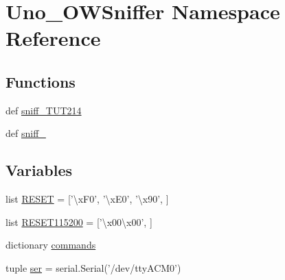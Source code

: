 \hypertarget{namespaceUno__OWSniffer}{\section{Uno\-\_\-\-O\-W\-Sniffer Namespace Reference}
\label{namespaceUno__OWSniffer}
}
\subsection*{Functions}
\begin{DoxyCompactItemize}
\item 
def \hyperlink{namespaceUno__OWSniffer_ab9b7dbfd72b7d37ee84523977c52fc53}{sniff\-\_\-\-T\-U\-T214}
\item 
def \hyperlink{namespaceUno__OWSniffer_adafc8a4e9025e3c731c0d0c50e475350}{sniff\-\_}
\end{DoxyCompactItemize}
\subsection*{Variables}
\begin{DoxyCompactItemize}
\item 
list \hyperlink{namespaceUno__OWSniffer_a0c1cd33218ffd203a838f4c363260b49}{R\-E\-S\-E\-T} = \mbox{[}'\textbackslash{}x\-F0', '\textbackslash{}x\-E0', '\textbackslash{}x90', \mbox{]}
\item 
list \hyperlink{namespaceUno__OWSniffer_a81c5acf2bd7c14bbe7f42d298aecdbb2}{R\-E\-S\-E\-T115200} = \mbox{[}'\textbackslash{}x00\textbackslash{}x00', \mbox{]}
\item 
dictionary \hyperlink{namespaceUno__OWSniffer_acad62719eb322f74fd0ad2b3189cef0a}{commands}
\item 
tuple \hyperlink{namespaceUno__OWSniffer_a89deaca78d0f86d69cd8825306cf0ac2}{ser} = serial.\-Serial('/dev/tty\-A\-C\-M0')
\end{DoxyCompactItemize}



